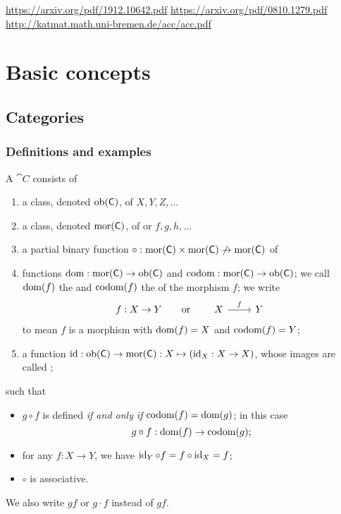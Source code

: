 \url{https://arxiv.org/pdf/1912.10642.pdf}
\url{https://arxiv.org/pdf/0810.1279.pdf}
\url{http://katmat.math.uni-bremen.de/acc/acc.pdf}

\chapter{Basic concepts}
\section{Categories}
\subsection{Definitions and examples}
\begin{definition}
A  $\cat{C}$ consists of
\begin{enumerate}
\item a class, denoted $\operatorname{ob}(\mathsf{C})$, of  $X,Y,Z,\ldots$
\item a class, denoted $\operatorname{mor}(\mathsf{C})$, of  or  $f,g,h,\ldots$
\item a partial binary function $\circ: \operatorname{mor}(\mathsf{C}) \times \operatorname{mor}(\mathsf{C}) \not\to \operatorname{mor}(\mathsf{C})$ of 
\item functions $\operatorname{dom}: \operatorname{mor}(\mathsf{C}) \to \operatorname{ob}(\mathsf{C})$ and $\operatorname{codom}: \operatorname{mor}(\mathsf{C}) \to \operatorname{ob}(\mathsf{C})$; we call $\operatorname{dom}(f)$ the  and $\operatorname{codom}(f)$ the  of the morphism $f$; we write
\[ f: X \to Y \qquad\text{or}\qquad \begin{tikzcd}
X \rar{f} & Y
\end{tikzcd}  \]
to mean $f$ is a morphism with $\operatorname{dom}(f) = X$ and $\operatorname{codom}(f) = Y$;
\item a function $\operatorname{id}: \operatorname{ob}(\mathsf{C}) \to \operatorname{mor}(\mathsf{C}): X\mapsto (\operatorname{id}_X: X\to X)$, whose images are called ;
\end{enumerate}
such that
\begin{itemize}
\item $g\circ f$ is defined \emph{if and only if} $\operatorname{codom}(f) = \operatorname{dom}(g)$; in this case
\[ g\circ f: \operatorname{dom}(f) \to \operatorname{codom}(g); \]
\item for any $f: X\to Y$, we have $\operatorname{id}_Y\circ f = f\circ \operatorname{id}_X = f$;
\item $\circ$ is associative.
\end{itemize}
We also write $gf$ or $g\cdot f$ instead of $gf$.
\end{definition}

